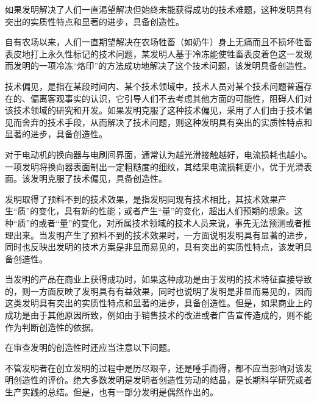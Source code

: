 如果发明解决了人们一直渴望解决但始终未能获得成功的技术难题，这种发明具有突出的实质性特点和显著的进步，具备创造性。

{\par}

自有农场以来，人们一直期望解决在农场牲畜（如奶牛）身上无痛而且不损坏牲畜表皮地打上永久性标记的技术问题，某发明人基于冷冻能使牲畜表皮着色这一发现而发明的一项冷冻“烙印”的方法成功地解决了这个技术问题，该发明具备创造性。

技术偏见，是指在某段时间内、某个技术领域中，技术人员对某个技术问题普遍存在的、偏离客观事实的认识，它引导人们不去考虑其他方面的可能性，阻碍人们对该技术领域的研究和开发。如果发明克服了这种技术偏见，采用了人们由于技术偏见而舍弃的技术手段，从而解决了技术问题，则这种发明具有突出的实质性特点和显著的进步，具备创造性。

{\par}

对于电动机的换向器与电刷间界面，通常认为越光滑接触越好，电流损耗也越小。一项发明将换向器表面制出一定粗糙度的细纹，其结果电流损耗更小，优于光滑表面。该发明克服了技术偏见，具备创造性。

发明取得了预料不到的技术效果，是指发明同现有技术相比，其技术效果产生“质”的变化，具有新的性能；或者产生“量”的变化，超出人们预期的想象。这种“质”的或者“量”的变化，对所属技术领域的技术人员来说，事先无法预测或者推理出来。当发明产生了预料不到的技术效果时，一方面说明发明具有显著的进步，同时也反映出发明的技术方案是非显而易见的，具有突出的实质性特点，该发明具备创造性。

当发明的产品在商业上获得成功时，如果这种成功是由于发明的技术特征直接导致的，则一方面反映了发明具有有益效果，同时也说明了发明是非显而易见的，因而这类发明具有突出的实质性特点和显著的进步，具备创造性。但是，如果商业上的成功是由于其他原因所致，例如由于销售技术的改进或者广告宣传造成的，则不能作为判断创造性的依据。

在审查发明的创造性时还应当注意以下问题。

不管发明者在创立发明的过程中是历尽艰辛，还是唾手而得，都不应当影响对该发明创造性的评价。绝大多数发明是发明者创造性劳动的结晶，是长期科学研究或者生产实践的总结。但是，也有一部分发明是偶然作出的。

